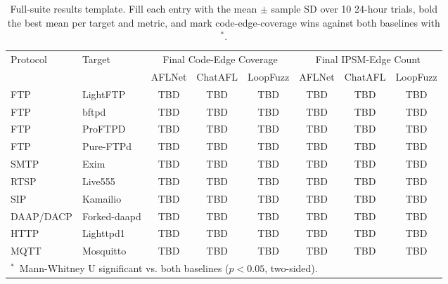 \documentclass[conference]{IEEEtran}
\begin{document}
\iffalse
\begin{table}[t]
\centering
\caption{Full-suite results template. Fill each entry with the mean $\pm$ sample SD over 10 24-hour trials, bold the best mean per target and metric, and mark code-edge-coverage wins against both baselines with $^*$.}
\label{tab:full_suite_results_template}
\scriptsize
\begin{tabular}{l l|ccc|ccc}
\toprule
\multirow{2}{*}{Protocol} & \multirow{2}{*}{Target} & \multicolumn{3}{c|}{Final Code-Edge Coverage} & \multicolumn{3}{c}{Final IPSM-Edge Count} \\
& & AFLNet & ChatAFL & LoopFuzz & AFLNet & ChatAFL & LoopFuzz \\
\midrule
FTP & LightFTP & TBD & TBD & TBD & TBD & TBD & TBD \\
FTP & bftpd & TBD & TBD & TBD & TBD & TBD & TBD \\
FTP & ProFTPD & TBD & TBD & TBD & TBD & TBD & TBD \\
FTP & Pure-FTPd & TBD & TBD & TBD & TBD & TBD & TBD \\
SMTP & Exim & TBD & TBD & TBD & TBD & TBD & TBD \\
RTSP & Live555 & TBD & TBD & TBD & TBD & TBD & TBD \\
SIP & Kamailio & TBD & TBD & TBD & TBD & TBD & TBD \\
DAAP/DACP & Forked-daapd & TBD & TBD & TBD & TBD & TBD & TBD \\
HTTP & Lighttpd1 & TBD & TBD & TBD & TBD & TBD & TBD \\
MQTT & Mosquitto & TBD & TBD & TBD & TBD & TBD & TBD \\
\bottomrule
\multicolumn{8}{l}{\footnotesize $^*$~Mann-Whitney U significant vs. both baselines ($p < 0.05$, two-sided).} \\
\end{tabular}
\normalsize
\end{table}
\end{document}
